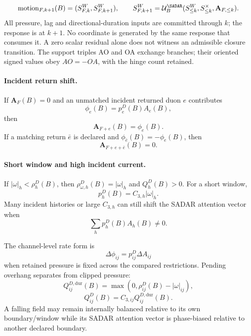 \begin{equation}
\operatorname{motion}_{F,k+1}(B)=(S^W_{F,k},S^W_{F,k+1}),\qquad
S^W_{F,k+1}=\mathcal U^{\SADAR}_B(S^W_{\le k},S^\times_{\le k},\mathbf A_{F,\le k}).
\label{eq:causal-update}
\end{equation}
All pressure, lag and directional-duration inputs are committed through
\(k\); the response is at \(k+1\). No coordinate is generated by the same
response that consumes it. A zero scalar residual alone does not witness
an admissible closure transition. 
The support triples AO and OA exchange branches; their
oriented signed values obey \(AO=-OA\), with the hinge count retained.\label{eq:ao-oa-oriented-value}

\paragraph{Incident return shift.}
If \(\mathbf A_F(B)=0\) and an unmatched incident returned duon \(e\) contributes
\[
\phi_e(B)=p^D_e(B)A_e(B),
\]
then
\begin{equation}
\mathbf A_{F+e}(B)=\phi_e(B).
\label{eq:incident-return-shift}
\end{equation}
If a matching return \(\bar e\) is declared and \(\phi_{\bar e}(B)=-\phi_e(B)\), then
\begin{equation}
\mathbf A_{F+e+\bar e}(B)=0.
\label{eq:matched-return-cancellation}
\end{equation}

\paragraph{Short window and high incident current.}
If \(|\omega|_h<\rho^D_h(B)\), then \(\rho^D_{\omega,h}(B)=|\omega|_h\) and \(Q^D_h(B)>0\). For a short window,
\[
p^D_h(B)=C_{3,h}|\omega|_h.
\]
Many incident histories or large \(C_{3,h}\) can still shift the SADAR attention vector when
\[
\sum_h p^D_h(B)A_h(B)\ne0.
\]

The channel-level rate form is
\[
\Delta\phi_{ij}=p^D_{ij}\Delta A_{ij}
\]
when retained pressure is fixed across the compared restrictions. Pending overhang separates from clipped pressure:
\begin{equation}
Q^{D,\mathrm{dur}}_{ij}(B)=\max\!\left(0,\rho^D_{ij}(B)-|\omega|_{ij}\right),
\label{eq:duration-overhang}
\end{equation}
\begin{equation}
Q^D_{ij}(B)=C_{3,ij}Q^{D,\mathrm{dur}}_{ij}(B).
\label{eq:burden-overhang}
\end{equation}
A falling field may remain internally balanced relative to its own boundary/window while its SADAR attention vector is phase-biased relative to another declared boundary.

